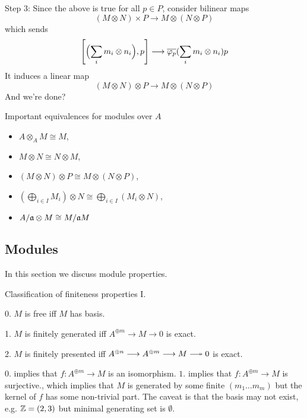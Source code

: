 Step 3: Since the above is true for all $p\in P$, consider bilinear maps
$$(M\otimes N)\times P \rightarrow M \otimes (N\otimes P)$$
which sends 
$$\Bigg[\Bigl(\sum_i m_i \otimes n_i\Bigl), p \Bigg] \longrightarrow \overline{\varphi_p}(\sum_i m_i \otimes n_i)p$$
It induces a linear map 
$$(M\otimes N)\otimes P \rightarrow M \otimes (N\otimes P)$$
And we're done?
\begin{theorem}
    Important equivalences for modules over $A$
    \begin{itemize}
        \item $A\otimes_A M \cong M$,
        \item $M \otimes N \cong N \otimes M$,
        \item $(M\otimes N) \otimes P \cong M \otimes (N \otimes P)$,
        \item $(\bigoplus_{i\in I} M_i) \otimes N \cong \bigoplus_{i\in I} (M_i \otimes N)$,
        \item $A/\mathfrak{a} \otimes M \cong M/\mathfrak{a} M$ 
    \end{itemize}
\end{theorem}

\subsection{Modules}

In this section we discuss module properties.

\begin{definition}
    Classification of finiteness properties I.

    0. $M$ is free iff $M$ has basis.

    1. $M$ is finitely generated iff $A^{\oplus m} \longrightarrow M \longrightarrow 0$ is exact.

    2. $M$ is finitely presented iff $A^{\oplus n} \longrightarrow A^{\oplus m} \longrightarrow M \longtwoheadrightarrow 0$ is exact.
\end{definition}

$0.$ implies that $f:A^{\oplus m} \longrightarrow M$ is an isomorphism. $1.$ implies that $f:A^{\oplus m} \longrightarrow M$ is surjective., which implies that $M$ is generated by some finite $(m_1\ldots m_m)$ but the kernel of $f$ has some non-trivial part. The caveat is that the basis may not exist, e.g. $\mathbb{Z} = (2,3)$ but minimal generating set is $\emptyset$.

